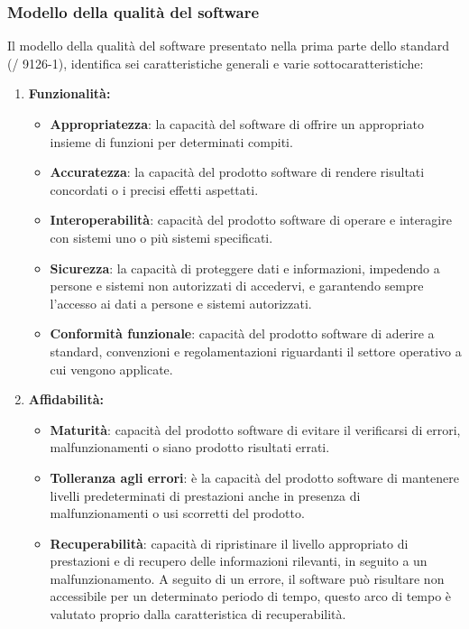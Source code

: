   \subsubsection{Modello della qualità del software}
  Il modello della qualità del software presentato nella prima parte dello standard (/ 9126-1), identifica sei caratteristiche generali e varie sottocaratteristiche:
  \begin{enumerate}
    \item \textbf{Funzionalità:}
    \begin{itemize}
        \item \textbf{Appropriatezza}: la capacità del software di offrire un appropriato insieme di funzioni per determinati compiti.
        \item \textbf{Accuratezza}: la capacità del prodotto software di rendere risultati concordati o i precisi effetti aspettati.
        \item \textbf{Interoperabilità}: capacità del prodotto software di operare e interagire con sistemi uno o più sistemi specificati.
        \item \textbf{Sicurezza}: la capacità di proteggere dati e informazioni, impedendo a persone e sistemi non autorizzati di accedervi, e garantendo sempre l'accesso ai dati a persone e sistemi autorizzati.
        \item \textbf{Conformità funzionale}: capacità del prodotto software di aderire a standard, convenzioni e regolamentazioni riguardanti il settore operativo a cui vengono applicate.
    \end{itemize}
    \item \textbf{Affidabilità:}
    \begin{itemize}
      \item \textbf{Maturità}: capacità del prodotto software di evitare il verificarsi di errori, malfunzionamenti o siano prodotto risultati errati.
      \item \textbf{Tolleranza agli errori}: è la capacità del prodotto software di mantenere livelli predeterminati di prestazioni anche in presenza di malfunzionamenti o usi scorretti del prodotto.
      \item \textbf{Recuperabilità}: capacità di ripristinare il livello appropriato di prestazioni e di recupero delle informazioni rilevanti, in seguito a un malfunzionamento.
      A seguito di un errore, il software può risultare non accessibile per un determinato periodo di tempo, questo arco di tempo è valutato proprio dalla caratteristica di recuperabilità.

\end{itemize}
\end{enumerate}

